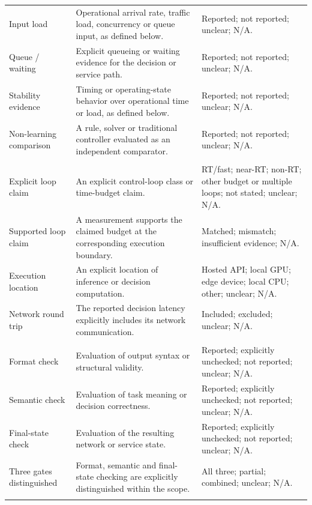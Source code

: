 \begin{longtable}{>{\raggedright\arraybackslash}p{.20\sokdefinitionwidth}>{\raggedright\arraybackslash}p{.47\sokdefinitionwidth}>{\raggedright\arraybackslash}p{.33\sokdefinitionwidth}}
Input load & Operational arrival rate, traffic load, concurrency or queue input, as defined below. & Reported; not reported; unclear; N/A. \\ \addlinespace[3pt]
Queue / waiting & Explicit queueing or waiting evidence for the decision or service path. & Reported; not reported; unclear; N/A. \\ \addlinespace[3pt]
Stability evidence & Timing or operating-state behavior over operational time or load, as defined below. & Reported; not reported; unclear; N/A. \\ \addlinespace[3pt]
Non-learning comparison & A rule, solver or traditional controller evaluated as an independent comparator. & Reported; not reported; unclear; N/A. \\ \addlinespace[3pt]
\rowcolor{ebAmber!45}\multicolumn{3}{l}{\textbf{\itshape Control-loop claim and deployment}} \\*
Explicit loop claim & An explicit control-loop class or time-budget claim. & RT/fast; near-RT; non-RT; other budget or multiple loops; not stated; unclear; N/A. \\ \addlinespace[3pt]
Supported loop claim & A measurement supports the claimed budget at the corresponding execution boundary. & Matched; mismatch; insufficient evidence; N/A. \\ \addlinespace[3pt]
Execution location & An explicit location of inference or decision computation. & Hosted API; local GPU; edge device; local CPU; other; unclear; N/A. \\ \addlinespace[3pt]
Network round trip & The reported decision latency explicitly includes its network communication. & Included; excluded; unclear; N/A. \\ \addlinespace[3pt]
\rowcolor{ebAmber!45}\multicolumn{3}{l}{\textbf{\itshape Validation responsibilities}} \\*
Format check & Evaluation of output syntax or structural validity. & Reported; explicitly unchecked; not reported; unclear; N/A. \\ \addlinespace[3pt]
Semantic check & Evaluation of task meaning or decision correctness. & Reported; explicitly unchecked; not reported; unclear; N/A. \\ \addlinespace[3pt]
Final-state check & Evaluation of the resulting network or service state. & Reported; explicitly unchecked; not reported; unclear; N/A. \\ \addlinespace[3pt]
Three gates distinguished & Format, semantic and final-state checking are explicitly distinguished within the scope. & All three; partial; combined; unclear; N/A. \\ \addlinespace[3pt]

\end{longtable}
